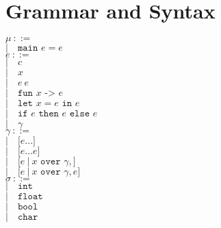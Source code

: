 ﻿\documentclass[5pt]{article}
\begin{document}
\section{Grammar and Syntax}
\begin{multicols}{2}
\noindent $\mu \ ::= $ \\
\hspace*{10mm} $| \quad \texttt{main } e = e$ \\

\noindent $e \ ::= $ \\
\hspace*{10mm} $| \quad c$ \\
\hspace*{10mm} $| \quad x$ \\
\hspace*{10mm} $| \quad e \ e$ \\
\hspace*{10mm} $| \quad \texttt{fun } x \texttt{ -> } e$ \\
\hspace*{10mm} $| \quad \texttt{let }x = e \texttt{ in } e$ \\
\hspace*{10mm} $| \quad \texttt{if } e \texttt{ then } e \texttt{ else } e$ \\
\hspace*{10mm} $| \quad \gamma$ \\

\noindent $\gamma \ ::= $ \\
\hspace*{10mm} $| \quad \texttt{[}e...\texttt{]}$ \\
\hspace*{10mm} $| \quad \texttt{[}e...e\texttt{]}$ \\
\hspace*{10mm} $| \quad \texttt{[}e \ | \ x \texttt{ over } \gamma, \texttt{]}$ \\
\hspace*{10mm} $| \quad \texttt{[}e \ | \ x \texttt{ over } \gamma, e \texttt{]}$ \\

\noindent $\sigma \ ::= $ \\
\hspace*{10mm} $| \quad \texttt{int}$ \\
\hspace*{10mm} $| \quad \texttt{float}$ \\
\hspace*{10mm} $| \quad \texttt{bool}$ \\
\hspace*{10mm} $| \quad \texttt{char}$ \\


\end{multicols}
\end{document}

